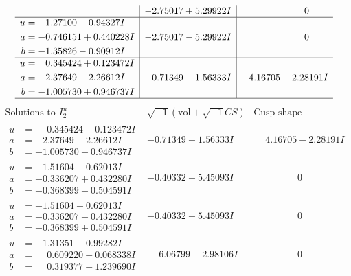 \documentclass[1p]{elsarticle_modified}
\theoremstyle{definition}
\newcommand{\I}{\sqrt{-1}}
\begin{document}
$$\begin{array}{c|c|c}
 & -2.75017 + 5.29922 I & \phantom{-0.000000 } 0 \\ \hline\begin{aligned}
u &= \phantom{-}1.27100 - 0.94327 I \\
a &= -0.746151 + 0.440228 I \\
b &= -1.35826 - 0.90912 I\end{aligned}
 & -2.75017 - 5.29922 I & \phantom{-0.000000 } 0 \\ \hline\begin{aligned}
u &= \phantom{-}0.345424 + 0.123472 I \\
a &= -2.37649 - 2.26612 I \\
b &= -1.005730 + 0.946737 I\end{aligned}
 & -0.71349 - 1.56333 I & \phantom{-}4.16705 + 2.28191 I\\
 \hline 
 \end{array}$$\newpage$$\begin{array}{c|c|c}  
\text{Solutions to }I^u_{2}& \I (\text{vol} + \sqrt{-1}CS) & \text{Cusp shape}\\
 \hline 
\begin{aligned}
u &= \phantom{-}0.345424 - 0.123472 I \\
a &= -2.37649 + 2.26612 I \\
b &= -1.005730 - 0.946737 I\end{aligned}
 & -0.71349 + 1.56333 I & \phantom{-}4.16705 - 2.28191 I \\ \hline\begin{aligned}
u &= -1.51604 + 0.62013 I \\
a &= -0.336207 + 0.432280 I \\
b &= -0.368399 - 0.504591 I\end{aligned}
 & -0.40332 - 5.45093 I & \phantom{-0.000000 } 0 \\ \hline\begin{aligned}
u &= -1.51604 - 0.62013 I \\
a &= -0.336207 - 0.432280 I \\
b &= -0.368399 + 0.504591 I\end{aligned}
 & -0.40332 + 5.45093 I & \phantom{-0.000000 } 0 \\ \hline\begin{aligned}
u &= -1.31351 + 0.99282 I \\
a &= \phantom{-}0.609220 + 0.068338 I \\
b &= \phantom{-}0.319377 + 1.239690 I\end{aligned}
 & \phantom{-}6.06799 + 2.98106 I & \phantom{-0.000000 } 0 \\ \hline\begin{aligned}

\end{aligned}
\end{array}$$
\end{document}
